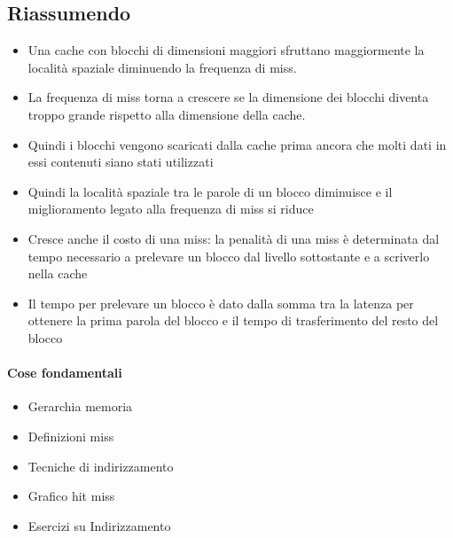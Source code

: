 \documentclass[12pt, a4paper, openany]{book}
\begin{document}
\subsection{Riassumendo}
\begin{itemize}
    \item Una cache con blocchi di dimensioni maggiori sfruttano maggiormente la località
    spaziale diminuendo la frequenza di miss.
    \item La frequenza di miss torna a crescere se la dimensione dei blocchi diventa troppo
    grande rispetto alla dimensione della cache.
    \item Quindi i blocchi vengono scaricati dalla cache prima ancora che molti dati
    in essi contenuti siano stati utilizzati
    \item Quindi la località spaziale tra le parole di un blocco diminuisce e il
    miglioramento legato alla frequenza di miss si riduce
    \item Cresce anche il costo di una miss: la penalità di una miss è determinata
    dal tempo necessario a prelevare un blocco dal livello sottostante e a scriverlo nella cache
    \item Il tempo per prelevare un blocco è dato dalla somma tra la latenza per ottenere
    la prima parola del blocco e il tempo di trasferimento del resto del blocco
\end{itemize}

\paragraph*{Cose fondamentali}
\begin{itemize}
    \item Gerarchia memoria
    \item Definizioni miss
    \item Tecniche di indirizzamento
    \item Grafico hit miss
    \item Esercizi su Indirizzamento
\end{itemize}
\end{document}

